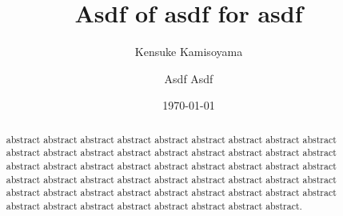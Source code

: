 \documentclass[dvipdfmx,twocolumn,preprintnumbers,superscriptaddress,nofootinbib]{revtex4-2}
\begin{document}
\title{Asdf of asdf for asdf}

\author{Kensuke Kamisoyama}

    \author{Asdf Asdf}

\date{\today}

\begin{abstract}
    abstract abstract abstract abstract abstract abstract abstract abstract abstract abstract abstract abstract abstract abstract abstract abstract abstract abstract abstract abstract abstract abstract abstract abstract abstract abstract abstract abstract abstract abstract abstract abstract abstract abstract abstract abstract abstract abstract abstract abstract abstract abstract abstract abstract abstract abstract abstract abstract abstract abstract abstract abstract abstract.
\end{abstract}


\maketitle




\newpage


\newpage

\end{document}
